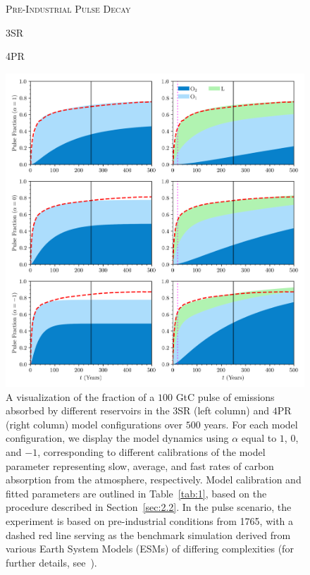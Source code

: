 \documentclass[11pt, a4paper, pdftex, twoside, dvipsnames]{article}
\renewcommand{\ref}{\cref}
\begin{document}
\begin{figure}[!htbp]
    \centering
\textsc{Pre-Industrial Pulse Decay}\vspace{2em}
\noindent %
\begin{minipage}{0.5\textwidth}
	\noindent
	\centering
	\hspace{3em}\small{\textsc{3SR}}
\end{minipage}%
\begin{minipage}{0.5\textwidth}
	\noindent
	\centering
	\small{\textsc{4PR}}
\end{minipage}
    \includegraphics[width=\textwidth]{fig/analysis_flux_alpha.png}
    \caption{
A visualization of the fraction of a $100$ GtC pulse of emissions absorbed by different reservoirs in the $3$SR (left column) and $4$PR (right column) model configurations over $500$ years.
%
For each model configuration, we display the model dynamics using $\alpha$ equal to $1$, $0$, and $-1$, corresponding to different calibrations of the model parameter representing slow, average, and fast rates of carbon absorption from the atmosphere, respectively.
%
Model calibration and fitted parameters are outlined in Table~\ref{tab:1}, based on the procedure described in Section~\ref{sec:2.2}.
%
In the pulse scenario, the experiment is based on pre-industrial conditions from 1765, with a dashed red line serving as the benchmark simulation derived from various Earth System Models (ESMs) of differing complexities (for further details, see~\cite{joos2013carbon}).
}
\end{figure}
\end{document}

